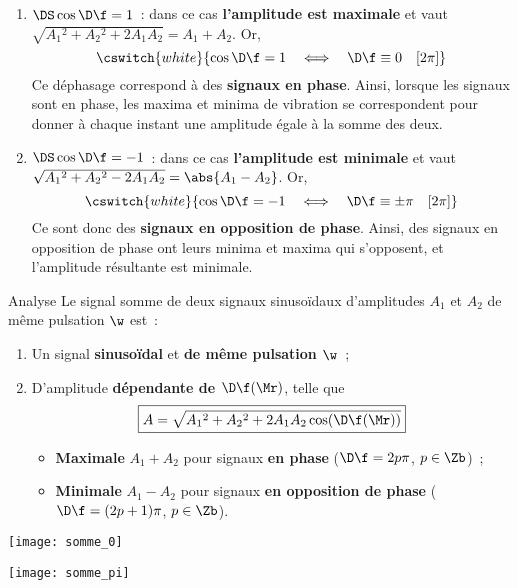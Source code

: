 \documentclass[../main/main.tex]{subfiles}
\begin{document}
\begin{enumerate}[label=$\triangleright$]
    \item $\DS \cos \D\f = 1$~: dans ce cas
        \textbf{l'amplitude est maximale} et vaut
        $\sqrt{A_1{}^2+A_2{}^2+2A_1A_2} = A_1+A_2$. Or,
        \[\cswitch{white}{
            \cos \D\f = 1
            \quad\Longleftrightarrow\quad
            \D\f \equiv 0 \quad[2\pi]
        }\]
        Ce déphasage correspond à des \textbf{signaux en phase}. Ainsi, lorsque
        les signaux sont en phase, les maxima et minima de vibration se
        correspondent pour donner à chaque instant une amplitude égale à la
        somme des deux.
    \item $\DS \cos \D\f = -1$~: dans ce cas \textbf{l'amplitude est minimale}
        et vaut $\sqrt{A_1{}^2+A_2{}^2-2A_1A_2} = \abs{A_1-A_2}$. Or,
        \[\cswitch{white}{
            \cos \D\f = -1
            \quad\Longleftrightarrow\quad
            \D\f \equiv \pm\pi \quad[2\pi]
        }\]
        Ce sont donc des \textbf{signaux en opposition de phase}. Ainsi, des
        signaux en opposition de phase ont leurs minima et maxima qui
        s'opposent, et l'amplitude résultante est minimale.
\end{enumerate}
\begin{bror}{Analyse}
    Le signal somme de deux signaux sinusoïdaux d'amplitudes $A_1$ et $A_2$ de
    même pulsation $\w$ est~:
    \begin{enumerate}
        \item Un signal \textbf{sinusoïdal} et \textbf{de même pulsation
            $\mathbf{\w}$}~;
        \item D'amplitude \textbf{dépendante de $\mathbf{\D\f(\Mr)}$}, telle que
            \[\boxed{A = \sqrt{A_1{}^2+A_2{}^2 + 2A_1A_2\cos(\D\f(\Mr))}}\]
            \begin{itemize}
                \item \textbf{Maximale} $A_1 + A_2$ pour signaux \textbf{en
                    phase} ($\D\f = 2p\pi$, $p\in\Zb$)~;
                \item \textbf{Minimale} $A_1 - A_2$ pour signaux \textbf{en
                    opposition de phase} ($\D\f = (2p+1)\pi$, $p\in\Zb$).
            \end{itemize}
    \end{enumerate}
    \begin{minipage}{0.45\linewidth}
        \begin{center}
            \texttt{[image: somme\_0]}
            \label{fig:sommepi3}
        \end{center}
    \end{minipage}
    \hfill
    \begin{minipage}{0.45\linewidth}
        \begin{center}
            \texttt{[image: somme\_pi]}
            \label{fig:somme3pi4}
        \end{center}
    \end{minipage}
\end{bror}
\end{document}
